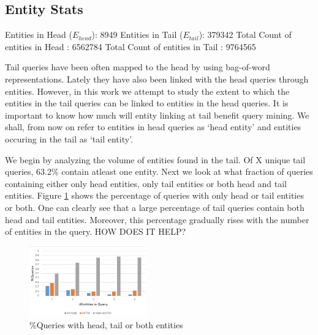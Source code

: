 \subsection{Entity Stats}

Entities in Head ($E_{head}$): 8949
Entities in Tail ($E_{tail}$): 379342
Total Count of entities in Head : 6562784
Total Count of entities in Tail : 9764565

Tail queries have been often mapped to the head \cite{} by using bag-of-word representations.
Lately they have also been linked with the head queries through entities. However, in this work
we attempt to study the extent to which the entities in the tail queries can be linked to entities 
in the head queries. It is important to know how much will entity linking at tail benefit query mining. 
We shall, from now on refer to entities in head queries as `head entity' 
and entities occuring in the tail as `tail entity'. 


We begin by analyzing the volume of entities found in the tail. Of X unique tail queries,
63.2\% contain atleast one entity. 
Next we look at what fraction of queries containing either only head entities, only tail entities 
or both head and tail entities. Figure \ref{img:headTailEntPercent} shows the percentage of 
queries with only head or tail entities or both. One can clearly see that a large percentage of tail 
queries contain both head and tail entities. Moreover, this percentage gradually rises with the 
number of entities in the query. HOW DOES IT HELP?

\begin{figure}[t]
\label{img:headTailEntPercent}
\caption{\%Queries with head, tail or both entities}
  \centering
    \includegraphics[width = 0.45\textwidth]{images/entity-head-tail-count.png}
\end{figure}
 
